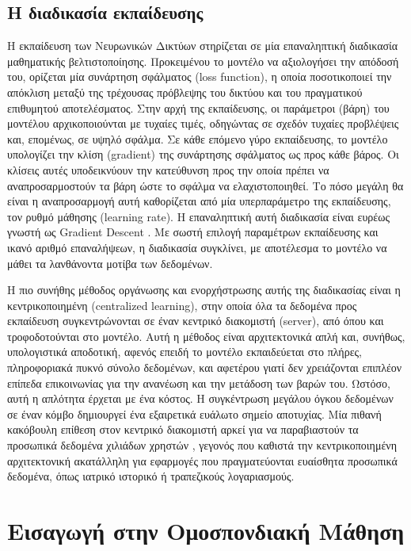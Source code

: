\subsection{Η διαδικασία εκπαίδευσης}\label{ssec:training}
Η εκπαίδευση των Νευρωνικών Δικτύων στηρίζεται σε μία επαναληπτική διαδικασία μαθηματικής βελτιστοποίησης. Προκειμένου το μοντέλο να αξιολογήσει την απόδοσή του, ορίζεται μία συνάρτηση σφάλματος (loss function), η οποία ποσοτικοποιεί την απόκλιση μεταξύ της τρέχουσας πρόβλεψης του δικτύου και του πραγματικού επιθυμητού αποτελέσματος. Στην αρχή της εκπαίδευσης, οι παράμετροι (βάρη) του μοντέλου αρχικοποιούνται με τυχαίες τιμές, οδηγώντας σε σχεδόν τυχαίες προβλέψεις και, επομένως, σε υψηλό σφάλμα. Σε κάθε επόμενο γύρο εκπαίδευσης, το μοντέλο υπολογίζει την κλίση (gradient) της συνάρτησης σφάλματος ως προς κάθε βάρος. Οι κλίσεις αυτές υποδεικνύουν την κατεύθυνση προς την οποία πρέπει να αναπροσαρμοστούν τα βάρη ώστε το σφάλμα να ελαχιστοποιηθεί. Το πόσο μεγάλη θα είναι η αναπροσαρμογή αυτή καθορίζεται από μία υπερπαράμετρο της εκπαίδευσης, τον ρυθμό μάθησης (learning rate). Η επαναληπτική αυτή διαδικασία είναι ευρέως γνωστή ως Gradient Descent \cite{mitchell_machine_1997}. Με σωστή επιλογή παραμέτρων εκπαίδευσης και ικανό αριθμό επαναλήψεων, η διαδικασία συγκλίνει, με αποτέλεσμα το μοντέλο να μάθει τα λανθάνοντα μοτίβα των δεδομένων.

Η πιο συνήθης μέθοδος οργάνωσης και ενορχήστρωσης αυτής της διαδικασίας είναι η κεντρικοποιημένη (centralized learning), στην οποία όλα τα δεδομένα προς εκπαίδευση συγκεντρώνονται σε έναν κεντρικό διακομιστή (server), από όπου και τροφοδοτούνται στο μοντέλο. Αυτή η μέθοδος είναι αρχιτεκτονικά απλή και, συνήθως, υπολογιστικά αποδοτική, αφενός επειδή το μοντέλο εκπαιδεύεται στο πλήρες, πληροφοριακά πυκνό σύνολο δεδομένων, και αφετέρου γιατί δεν χρειάζονται επιπλέον επίπεδα επικοινωνίας για την ανανέωση και την μετάδοση των βαρών του. Ωστόσο, αυτή η απλότητα έρχεται με ένα κόστος. Η συγκέντρωση μεγάλου όγκου δεδομένων σε έναν κόμβο δημιουργεί ένα εξαιρετικά ευάλωτο σημείο αποτυχίας. Μία πιθανή κακόβουλη επίθεση στον κεντρικό διακομιστή αρκεί για να παραβιαστούν τα προσωπικά δεδομένα χιλιάδων χρηστών \cite{kairouz_advances_2021}, γεγονός που καθιστά την κεντρικοποιημένη αρχιτεκτονική ακατάλληλη για εφαρμογές που πραγματεύονται ευαίσθητα προσωπικά δεδομένα, όπως ιατρικό ιστορικό ή τραπεζικούς λογαριασμούς.

\section{Εισαγωγή στην Ομοσπονδιακή Μάθηση}\label{sec:fl}
